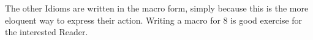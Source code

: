 \documentclass[twoside]{article}
\begin{document}
The other Idioms are written in the macro form, simply because this is the more eloquent way to express their action. Writing a macro for 8 is good exercise for the interested Reader.








\end{document}

